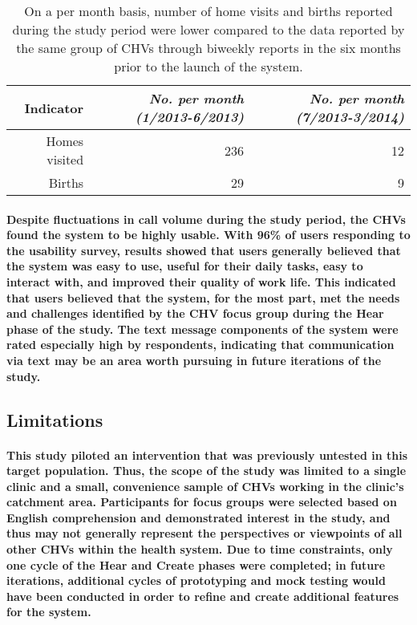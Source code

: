 \begin{table}[h]
  \centering
  \caption[Comparison of CHV report data from biweekly reports vs. patient management system reports]{On a per month basis, number of home visits and births reported during the study period were lower compared to the data reported by the same group of CHVs through biweekly reports in the six months prior to the launch of the system.}
    \begin{tabular}{rrr}
    \toprule
    \textbf{Indicator} & \textit{No. per month (1/2013-6/2013)} & \textit{No. per month (7/2013-3/2014)} \\
    \midrule
    Homes visited & 236   & 12 \\
    Births & 29    & 9 \\
    \bottomrule
    \end{tabular}%
  \label{tab:usagevsreport}%
\end{table}%

\paragraph{Despite fluctuations in call volume during the study period, the CHVs found the system to be highly usable. With 96\% of users responding to the usability survey, results showed that users generally believed that the system was easy to use, useful for their daily tasks, easy to interact with, and improved their quality of work life. This indicated that users believed that the system, for the most part, met the needs and challenges identified by the CHV focus group during the Hear phase of the study. The text message components of the system were rated especially high by respondents, indicating that communication via text may be an area worth pursuing in future iterations of the study.}

\subsection{Limitations}
\paragraph{This study piloted an intervention that was previously untested in this target population. Thus, the scope of the study was limited to a single clinic and a small, convenience sample of CHVs working in the clinic's catchment area. Participants for focus groups were selected based on English comprehension and demonstrated interest in the study, and thus may not generally represent the perspectives or viewpoints of all other CHVs within the health system. Due to time constraints, only one cycle of the Hear and Create phases were completed; in future iterations, additional cycles of prototyping and mock testing would have been conducted in order to refine and create additional features for the system.} 

